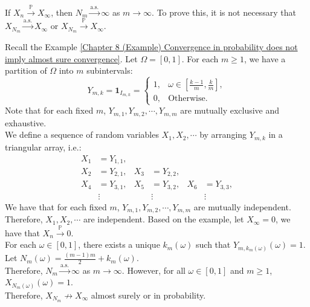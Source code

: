 \documentclass{huhtakm-template-book-v2}
\newcommand{\prob}{\mathbb{P}}
\begin{document}
    \begin{rem}
        If $X_{n} \xrightarrow{\prob} X_{\infty}$, then $N_{m} \xrightarrow{\text{a.s.}} \infty$ as $m \to \infty$.
        To prove this, it is not necessary that $X_{N_{m}} \xrightarrow{\text{a.s.}} X_{\infty}$ or $X_{N_{m}} \xrightarrow{\prob} X_{\infty}$.
    \end{rem}
    \begin{eg}
        Recall the Example \ref{Chapter 8 (Example) Convergence in probability does not imply almost sure convergence}. Let $\Omega = [0,1]$. For each $m \geq 1$, we have a partition of $\Omega$ into $m$ subintervals:
        \begin{equation*}
            Y_{m,k} = \mathbf{1}_{I_{m,k}} = \begin{cases}
                1, &\omega \in \left[\frac{k-1}{m},\frac{k}{m}\right],\\
                0, &\text{Otherwise}.
            \end{cases}
        \end{equation*}
        Note that for each fixed $m$, $Y_{m,1},Y_{m,2},\cdots,Y_{m,m}$ are mutually exclusive and exhaustive.\\
        We define a sequence of random variables $X_{1},X_{2},\cdots$ by arranging $Y_{m,k}$ in a triangular array, i.e.:
        \begin{align*}
            X_{1} &= Y_{1,1},\\
            X_{2} &= Y_{2,1}, & X_{3} &= Y_{2,2},\\
            X_{4} &= Y_{3,1}, & X_{5} &= Y_{3,2}, & X_{6} &= Y_{3,3},\\
            &\vdots & &\vdots & &\vdots
        \end{align*}
        We have that for each fixed $m$, $Y_{m,1},Y_{m,2},\cdots,Y_{m,m}$ are mutually independent.\\
        Therefore, $X_{1},X_{2},\cdots$ are independent. Based on the example, let $X_{\infty} = 0$, we have that $X_{n} \xrightarrow{\prob} 0$.\\
        For each $\omega \in [0,1]$, there exists a unique $k_{m}(\omega)$ such that $Y_{m,k_{m}(\omega)}(\omega) = 1$. Let $N_{m}(\omega) = \frac{(m-1)m}{2}+k_{m}(\omega)$.\\
        Therefore, $N_{m} \xrightarrow{\text{a.s.}} \infty$ as $m \to \infty$. However, for all $\omega \in [0,1]$ and $m \geq 1$, $X_{N_{m}(\omega)}(\omega) = 1$.\\
        Therefore, $X_{N_{m}} \not\rightarrow X_{\infty}$ almost surely or in probability.
    \end{eg}
    \newpage
\end{document}
